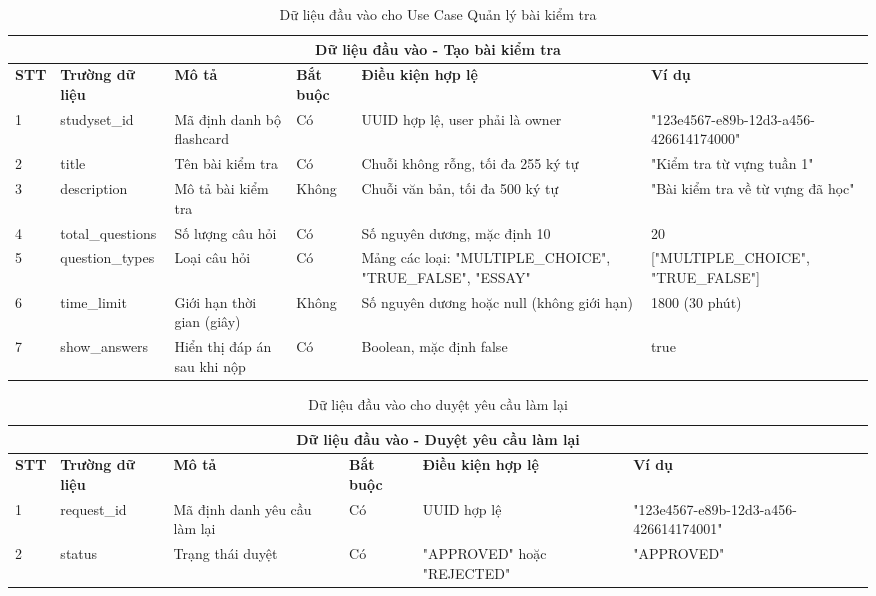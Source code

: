 \documentclass[../DoAn.tex]{subfiles}
\begin{document}
\begin{table}[h!]
\centering
\begin{tabular}{|m{1cm}|m{2.5cm}|m{3cm}|m{1cm}|m{2.5cm}|m{3.5cm}|}
    \hline
    \multicolumn{6}{|c|}{\textbf{Dữ liệu đầu vào - Tạo bài kiểm tra}} \\
    \hline
    \textbf{STT} & \textbf{Trường dữ liệu} & \textbf{Mô tả} & \textbf{Bắt buộc} & \textbf{Điều kiện hợp lệ} & \textbf{Ví dụ} \\
    \hline
    1 & studyset\_id & Mã định danh bộ flashcard & Có & UUID hợp lệ, user phải là owner & "123e4567-e89b-12d3-a456-426614174000" \\
    \hline
    2 & title & Tên bài kiểm tra & Có & Chuỗi không rỗng, tối đa 255 ký tự & "Kiểm tra từ vựng tuần 1" \\
    \hline
    3 & description & Mô tả bài kiểm tra & Không & Chuỗi văn bản, tối đa 500 ký tự & "Bài kiểm tra về từ vựng đã học" \\
    \hline
    4 & total\_questions & Số lượng câu hỏi & Có & Số nguyên dương, mặc định 10 & 20 \\
    \hline
    5 & question\_types & Loại câu hỏi & Có & Mảng các loại: "MULTIPLE\_CHOICE", "TRUE\_FALSE", "ESSAY" & ["MULTIPLE\_CHOICE", "TRUE\_FALSE"] \\
    \hline
    6 & time\_limit & Giới hạn thời gian (giây) & Không & Số nguyên dương hoặc null (không giới hạn) & 1800 (30 phút) \\
    \hline
    7 & show\_answers & Hiển thị đáp án sau khi nộp & Có & Boolean, mặc định false & true \\
    \hline
\end{tabular}
\caption{Dữ liệu đầu vào cho Use Case Quản lý bài kiểm tra}
\end{table}

\vspace{0.5cm}

\begin{table}[h!]
\centering
\begin{tabular}{|m{1cm}|m{2.5cm}|m{3cm}|m{1cm}|m{2.5cm}|m{3.5cm}|}
    \hline
    \multicolumn{6}{|c|}{\textbf{Dữ liệu đầu vào - Duyệt yêu cầu làm lại}} \\
    \hline
    \textbf{STT} & \textbf{Trường dữ liệu} & \textbf{Mô tả} & \textbf{Bắt buộc} & \textbf{Điều kiện hợp lệ} & \textbf{Ví dụ} \\
    \hline
    1 & request\_id & Mã định danh yêu cầu làm lại & Có & UUID hợp lệ & "123e4567-e89b-12d3-a456-426614174001" \\
    \hline
    2 & status & Trạng thái duyệt & Có & "APPROVED" hoặc "REJECTED" & "APPROVED" \\
    \hline
\end{tabular}
\caption{Dữ liệu đầu vào cho duyệt yêu cầu làm lại}
\end{table}
\end{document}
